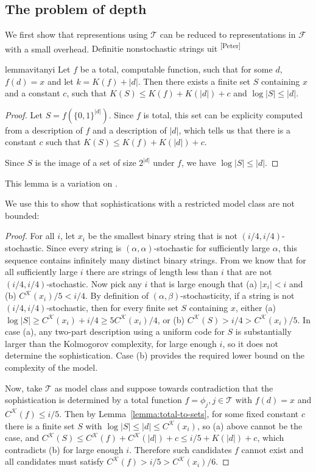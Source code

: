 \documentclass{style/llncs}
\newcommand{\T}{\mathscr T}
\newcommand{\F}{\mathscr F}
\newcommand{\K}{\mathscr K}
\newcommand{\pb}[1]{\textcolor{OliveGreen}{\small #1 \textsuperscript{[Peter]} }}
\begin{document}
\subsection{The problem of depth}

We first show that representions using $\T$ can be reduced to representations in $\F$ with a small overhead.
\pb{Definitie nonstochastic strings uit \cite[Proposition~I.3 (b)]{gacs2001algorithmic}}

\begin{restatable}{lemma}{vitanyi}
Let $f$ be a total, computable function, such that for some $d$, $f(d) = x$ and let $k = K(f) + |d|$. Then there exists a finite set $S$ containing $x$ and a constant $c$, such that $K(S) \leq K(f) + K(|d|) + c$ and $\log |S| \leq |d|$.\label{lemma:total-to-sets}
\end{restatable}
\begin{proof}
Let $S = f\left(\{0,1\}^{|d|}\right)$. Since $f$ is total, this set can be explicity computed from a description of $f$ and a description of $|d|$, which tells us that there is a constant $c$ such that $K(S) \leq K(f) + K(|d|) + c$. 

Since $S$ is the image of a set of size $2^{|d|}$ under $f$, we have $\log |S| \leq |d|$.
\end{proof}
\noindent This lemma is a variation on \cite[Lemma~7.2]{vitanyi2004meaningful}. 

We use this to show that sophistications with a restricted model class are not bounded:
\dogfood*
\begin{proof}
For all $i$, let $x_i$ be the smallest binary string that is not $(i/4, i/4)$-stochastic. Since every string is $(\alpha,\alpha)$-stochastic for sufficiently large $\alpha$, this sequence contains infinitely many distinct binary strings.
From \cite[Proposition~I.3 (b)]{gacs2001algorithmic} we know that for all sufficiently large $i$ there are strings of length less than $i$ that are not $(i/4, i/4)$-stochastic. Now pick any $i$ that is large enough that (a) $|x_i|<i$ and (b) $C^\K(x_i)/5 < i/4$. By definition of $(\alpha,\beta)$-stochasticity, if a string is not $(i/4,i/4)$-stochastic, then for every finite set $S$ containing $x$, either (a) $\log|S|\ge C^\K(x_i)+i/4\ge 5C^\K(x_i)/4$, or (b) $C^\K(S)>i/4>C^\K(x_i)/5$.
In case (a), any two-part description using a uniform code for $S$ is substantially larger than the Kolmogorov complexity, for large enough $i$, so it does not determine the sophistication. Case (b) provides the required lower bound on the complexity of the model.

Now, take $\T$ as model class and suppose towards contradiction that the sophistication is determined by a total function $f=\phi_j,j\in\T$ with $f(d)=x$ and $C^\K(f)\le i/5$. Then by Lemma~\ref{lemma:total-to-sets}, for some fixed constant $c$ there is a finite set $S$ with $\log|S|\le|d|\le C^\K(x_i)$, so (a) above cannot be the case, and $C^\K(S)\le C^\K(f)+C^\K(|d|)+c\le i/5+K(|d|)+c$, which contradicts (b) for large enough $i$. Therefore such candidates $f$ cannot exist and all candidates must satisfy $C^\K(f)>i/5>C^\K(x_i)/6$.
\end{proof}
\end{document}
